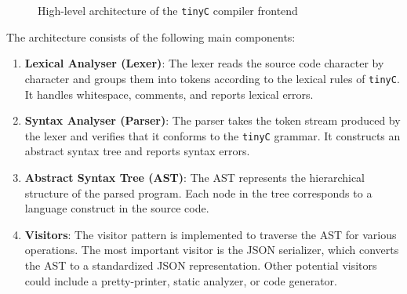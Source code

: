 \begin{figure}[ht]
    \centering
    \caption{High-level architecture of the \texttt{tinyC} compiler frontend}
    \label{fig:architecture}
\end{figure}

\pagebreak
The architecture consists of the following main components:

\begin{enumerate}
    \item \textbf{Lexical Analyser (Lexer)}: The lexer reads the source code character by character and groups them into tokens according to the lexical rules of \texttt{tinyC}. It handles whitespace, comments, and reports lexical errors.

    \item \textbf{Syntax Analyser (Parser)}: The parser takes the token stream produced by the lexer and verifies that it conforms to the \texttt{tinyC} grammar. It constructs an abstract syntax tree and reports syntax errors.

    \item \textbf{Abstract Syntax Tree (AST)}: The AST represents the hierarchical structure of the parsed program. Each node in the tree corresponds to a language construct in the source code.
    
    \item \textbf{Visitors}: The visitor pattern is implemented to traverse the AST for various operations. The most important visitor is the JSON serializer, which converts the AST to a standardized JSON representation. Other potential visitors could include a pretty-printer, static analyzer, or code generator.
\end{enumerate}

